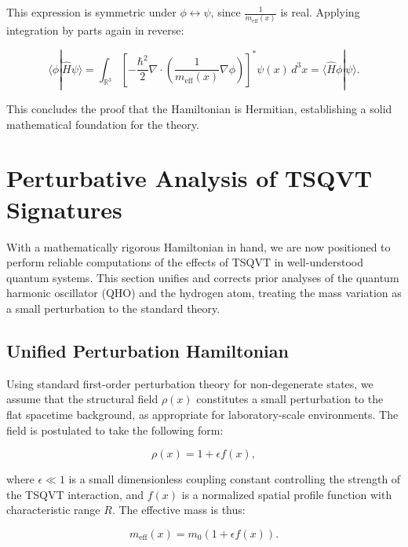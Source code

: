 \documentclass[a4paper]{article}
\begin{document}
This expression is symmetric under \( \phi \leftrightarrow \psi \), since \( \frac{1}{m_{\text{eff}}(x)} \) is real. Applying integration by parts again in reverse:

\begin{equation}
	\langle \phi | \hat{H} \psi \rangle = \int_{\mathbb{R}^3} \left[ -\frac{\hbar^2}{2} \nabla \cdot \left( \frac{1}{m_{\text{eff}}(x)} \nabla \phi \right) \right]^* \psi(x) \, d^3x = \langle \hat{H} \phi | \psi \rangle.
\end{equation}

This concludes the proof that the Hamiltonian is Hermitian, establishing a solid mathematical foundation for the theory.

\section{Perturbative Analysis of TSQVT Signatures}

With a mathematically rigorous Hamiltonian in hand, we are now positioned to perform reliable computations of the effects of TSQVT in well-understood quantum systems. This section unifies and corrects prior analyses of the quantum harmonic oscillator (QHO) and the hydrogen atom, treating the mass variation as a small perturbation to the standard theory.

\subsection{Unified Perturbation Hamiltonian}

Using standard first-order perturbation theory for non-degenerate states, we assume that the structural field \( \rho(x) \) constitutes a small perturbation to the flat spacetime background, as appropriate for laboratory-scale environments. The field is postulated to take the following form:


\begin{equation}
	\rho(x) = 1 + \epsilon f(x),
\end{equation}

where \( \epsilon \ll 1 \) is a small dimensionless coupling constant controlling the strength of the TSQVT interaction, and \( f(x) \) is a normalized spatial profile function with characteristic range \( R \). The effective mass is thus:

\begin{equation}
	m_{\text{eff}}(x) = m_0 (1 + \epsilon f(x)).
\end{equation}
\end{document}
